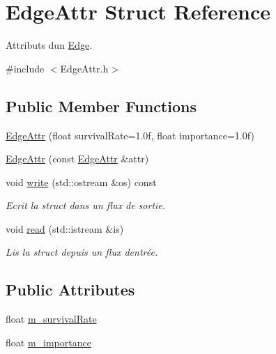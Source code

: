 \hypertarget{struct_edge_attr}{}\section{Edge\+Attr Struct Reference}
\label{struct_edge_attr}


Attributs d\textquotesingle{}un \mbox{\hyperlink{class_edge}{Edge}}.  




{\ttfamily \#include $<$Edge\+Attr.\+h$>$}

\subsection*{Public Member Functions}
\begin{DoxyCompactItemize}
\item 
\mbox{\hyperlink{struct_edge_attr_a6f055eafff1a137f3fe97e49508c65f5}{Edge\+Attr}} (float survival\+Rate=1.\+0f, float importance=1.\+0f)
\item 
\mbox{\hyperlink{struct_edge_attr_a0252b91de5679426054a8cd478ebfd1e}{Edge\+Attr}} (const \mbox{\hyperlink{struct_edge_attr}{Edge\+Attr}} \&attr)
\item 
void \mbox{\hyperlink{struct_edge_attr_ae06ea6b6bfd925ea64ce85ca1169411a}{write}} (std\+::ostream \&os) const
\begin{DoxyCompactList}\small\item\em Ecrit la struct dans un flux de sortie. \end{DoxyCompactList}\item 
void \mbox{\hyperlink{struct_edge_attr_a337958a03dbbc39c139ee507d73555be}{read}} (std\+::istream \&is)
\begin{DoxyCompactList}\small\item\em Lis la struct depuis un flux d\textquotesingle{}entrée. \end{DoxyCompactList}\end{DoxyCompactItemize}
\subsection*{Public Attributes}
\begin{DoxyCompactItemize}
\item 
float \mbox{\hyperlink{struct_edge_attr_ab59fbd7d336f72ac48294c8c7bb9e4ef}{m\+\_\+survival\+Rate}}
\item 
float \mbox{\hyperlink{struct_edge_attr_a56b31d6b4731ac893c4081e0eab931d0}{m\+\_\+importance}}
\end{DoxyCompactItemize}


